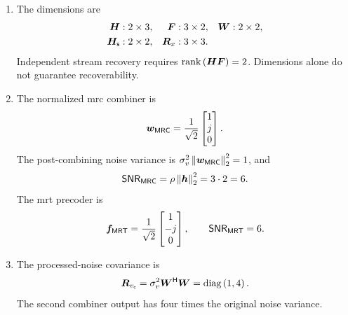 \begin{enumerate}[label=\textbf{E\arabic*.}]
	
	\item The dimensions are
	\begin{equation*}
		\begin{aligned}
			\bm{H}&:2\times3,&
			\bm{F}&:3\times2,&
			\bm{W}&:2\times2,\\
			\bm{H}_{\mathsf{s}}&:2\times2,&
			\bm{R}_x&:3\times3.
		\end{aligned}
	\end{equation*}
	Independent stream recovery requires
	$\operatorname{rank}\left(\bm{H}\bm{F}\right)=2$.
	Dimensions alone do not guarantee recoverability.
	
	\item The normalized \ac{mrc} combiner is
	\begin{equation*}
		\bm{w}_{\mathsf{MRC}}
		=\frac{1}{\sqrt{2}}
		\begin{bmatrix}1\\j\\0\end{bmatrix}.
	\end{equation*}
	The post-combining noise variance is
	$\sigma_v^2\left\|\bm{w}_{\mathsf{MRC}}\right\|_2^2=1$, and
	\begin{equation*}
		\mathsf{SNR}_{\mathsf{MRC}}
		=\rho\left\|\bm{h}\right\|_2^2
		=3\cdot2=6.
	\end{equation*}
	The \ac{mrt} precoder is
	\begin{equation*}
		\bm{f}_{\mathsf{MRT}}
		=\frac{1}{\sqrt{2}}
		\begin{bmatrix}1\\-j\\0\end{bmatrix},
		\qquad
		\mathsf{SNR}_{\mathsf{MRT}}=6.
	\end{equation*}
	
	\item The processed-noise covariance is
	\begin{equation*}
		\bm{R}_{v_{\mathsf c}}
		=\sigma_v^2{\bm{W}}^{\mathsf{H}}\bm{W}
		=\operatorname{diag}\left(1,4\right).
	\end{equation*}
	The second combiner output has four times
	the original noise variance.
	

\end{enumerate}
